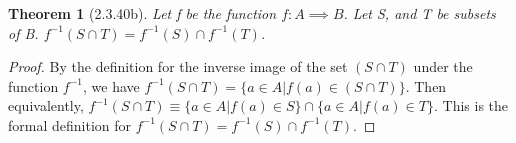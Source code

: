 \documentclass[a4paper, 12pt]{article}
\theoremstyle{plain}
\newtheorem*{theorem*}{Theorem}
\begin{document}
	
	\begin{theorem*}[2.3.40b]
		Let f be the function $f: A \implies B$. Let S, and T be subsets of B. $f^{-1}(S \cap T) = f^{-1}(S) \cap f^{-1}(T)$.
	\end{theorem*}
	
	\begin{proof}
		By the definition for the inverse image of the set $(S \cap T)$ under the function $f^{-1}$, we have $f^{-1}(S \cap T) = \{a \in A | f(a) \in (S \cap T)\}$. Then \newline equivalently, $f^{-1}(S \cap T) \equiv \{a \in A | f(a) \in S\} \cap \{a \in A | f(a) \in T\}$. This is the formal definition for $f^{-1}(S \cap T) = f^{-1}(S) \cap f^{-1}(T)$.
	\end{proof}
\end{document}
